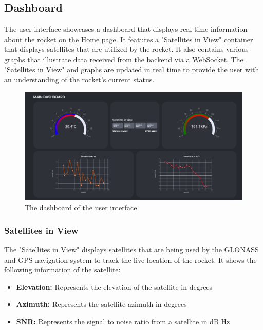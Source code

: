 
\subsectionfont{\fontsize{14}{14}\selectfont}
\graphicspath{{./images/}}


\subsection{Dashboard}
The user interface showcases a dashboard that displays real-time information about the rocket on the Home page. 
It features a "Satellites in View" container that displays satellites that are utilized by the rocket. 
It also contains various graphs that illustrate data received from the backend via a WebSocket. 
The "Satellites in View" and graphs are updated in real time to provide the user with an understanding 
of the rocket's current status. 

\begin{figure}[H]
    \includegraphics [scale=0.75] {ui_dashboard}
    \centering
     {The dashboard of the user interface}
\end{figure}

\subsubsection {Satellites in View}
The "Satellites in View" displays satellites that are being used by the GLONASS and GPS
navigation system to track the live location of the rocket. 
It shows the following information of the satellite:

\begin{itemize}
    \item \textbf{Elevation:} Represents the elevation of the satellite in degrees
    \item \textbf{Azimuth:} Represents the satellite azimuth in degrees
    \item \textbf{SNR:} Represents the signal to noise ratio from a satellite in dB Hz
\end{itemize}

